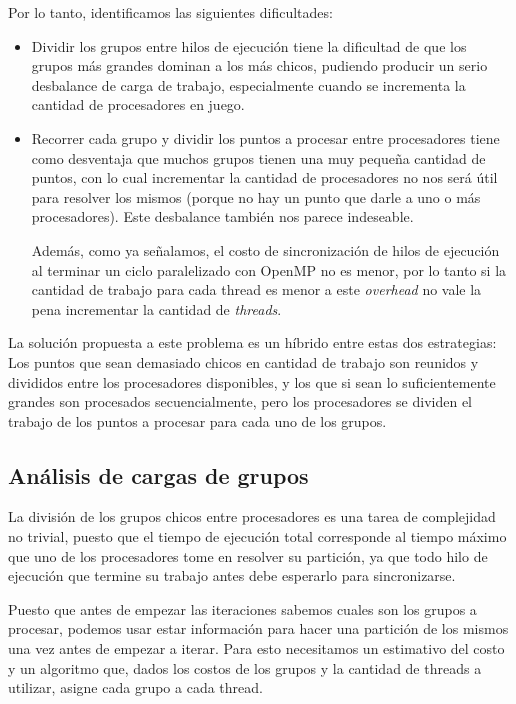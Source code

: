 Por lo tanto, identificamos las siguientes dificultades:

\begin{itemize}
    \item Dividir los grupos entre hilos de ejecuci\'on tiene la dificultad de que
    los grupos m\'as grandes dominan a los m\'as chicos, pudiendo producir un serio
    desbalance de carga de trabajo, especialmente cuando se incrementa la cantidad de
    procesadores en juego.
    \item Recorrer cada grupo y dividir los puntos a procesar entre procesadores
    tiene como desventaja que muchos grupos tienen una muy peque\~na cantidad de
    puntos, con lo cual incrementar la cantidad de procesadores no nos ser\'a \'util
    para resolver los mismos (porque no hay un punto que darle a uno o m\'as procesadores).
    Este desbalance tambi\'en nos parece indeseable.

    Adem\'as, como ya se\~nalamos, el costo de sincronizaci\'on de hilos de
    ejecuci\'on al terminar un ciclo paralelizado con OpenMP no es menor, por
    lo tanto si la cantidad de trabajo para cada thread es menor a este
    \textit{overhead} no vale la pena incrementar la cantidad de \textit{threads}.
\end{itemize}

La soluci\'on propuesta a este problema es un h\'ibrido entre estas dos
estrategias: Los puntos que sean demasiado chicos en cantidad de trabajo son
reunidos y divididos entre los procesadores disponibles, y los que si sean lo
suficientemente grandes son procesados secuencialmente, pero los procesadores se
dividen el trabajo de los puntos a procesar para cada uno de los grupos.

\subsection{An\'alisis de cargas de grupos}
\label{PredictorCPU}
La divisi\'on de los grupos chicos entre procesadores es una tarea de complejidad
no trivial, puesto que el tiempo de ejecuci\'on total corresponde al tiempo m\'aximo
que uno de los procesadores tome en resolver su partici\'on, ya que todo hilo de
ejecuci\'on que termine su trabajo antes debe esperarlo para sincronizarse.

Puesto que antes de empezar las iteraciones sabemos cuales son los grupos a
procesar, podemos usar estar informaci\'on para hacer una partici\'on de los mismos
una vez antes de empezar a iterar. Para esto necesitamos un estimativo del costo
y un algoritmo que, dados los costos de los grupos y la cantidad de threads a
utilizar, asigne cada grupo a cada thread.

